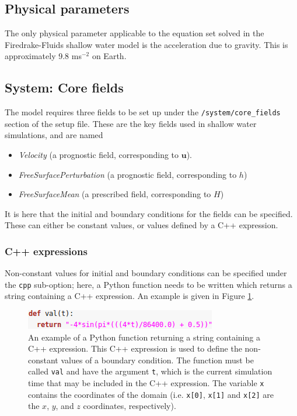 \documentclass[a4paper,11pt]{report}
\begin{document}
\subsection{Physical parameters}
The only physical parameter applicable to the equation set solved in the Firedrake-Fluids shallow water model is the acceleration due to gravity. This is approximately 9.8 ms$^{-2}$ on Earth.

\subsection{System: Core fields}
The model requires three fields to be set up under the \texttt{/system/core\_fields} section of the setup file. These are the key fields used in shallow water simulations, and are named
\begin{itemize}
   \item \textit{Velocity} (a prognostic field, corresponding to $\mathbf{u}$).
   \item \textit{FreeSurfacePerturbation} (a prognostic field, corresponding to $h$)
   \item \textit{FreeSurfaceMean} (a prescribed field, corresponding to $H$)
\end{itemize}
It is here that the initial and boundary conditions for the fields can be specified. These can either be constant values, or values defined by a C++ expression.

\subsubsection{C++ expressions}
Non-constant values for initial and boundary conditions can be specified under the \texttt{cpp} sub-option; here, a Python function needs to be written which returns a string containing a C++ expression. An example is given in Figure \ref{fig:cpp_expression}.

\begin{figure}[!ht]
   \centering
   \includegraphics[width=0.5\columnwidth]{images/cpp_expression.png}
   \caption{An example of a Python function returning a string containing a C++ expression. This C++ expression is used to define the non-constant values of a boundary condition. The function must be called \texttt{val} and have the argument \texttt{t}, which is the current simulation time that may be included in the C++ expression. The variable \texttt{x} contains the coordinates of the domain (i.e. \texttt{x[0]}, \texttt{x[1]} and \texttt{x[2]} are the $x$, $y$, and $z$ coordinates, respectively).}
   \label{fig:cpp_expression}
\end{figure}
\end{document}
